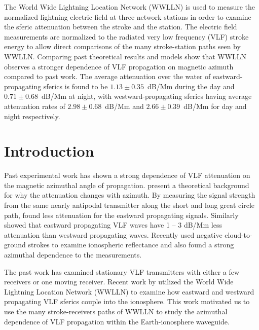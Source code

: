 

The World Wide Lightning Location Network (WWLLN) is used to measure the normalized lightning electric field at three network stations in order to examine the sferic attenuation between the stroke and the station.
The electric field measurements are normalized to the radiated very low frequency (VLF) stroke energy to allow direct comparisons of the many stroke-station paths seen by WWLLN.
Comparing past theoretical results and models show that WWLLN observes a stronger dependence of VLF propagation on magnetic azimuth compared to past work.
The average attenuation over the water of eastward-propagating sferics is found to be $1.13\pm0.35$~dB/Mm during the day and $0.71\pm0.68$~dB/Mm at night, with westward-propagating sferics having average attenuation rates of $2.98\pm0.68$~dB/Mm and $2.66\pm0.39$~dB/Mm for day and night respectively.

\section{Introduction}

Past experimental work has shown a strong dependence of VLF attenuation on the magnetic azimuthal angle of propagation.
\citet{Wait1960a} present a theoretical background for why the attenuation changes with azimuth.
By measuring the signal strength from the same nearly antipodal transmitter along the short and long great circle path, \citet{Crombie1958} found less attenuation for the eastward propagating signals.
Similarly \citet{Taylor1960a} showed that eastward propagating VLF waves have 1 -- 3 dB/Mm less attenuation than westward propagating waves.
Recently \citet{Jacobson2012} used negative cloud-to-ground strokes to examine ionospheric reflectance and also found a strong azimuthal dependence to the measurements.

The past work has examined stationary VLF transmitters with either a few receivers or one moving receiver.
Recent work by \citet{Burkholder2013} utilized the World Wide Lightning Location Network (WWLLN) to examine how eastward and westward propagating VLF sferics couple into the ionosphere.
This work motivated us to use the many stroke-receivers paths of WWLLN to study the azimuthal dependence of VLF propagation within the Earth-ionosphere waveguide.

